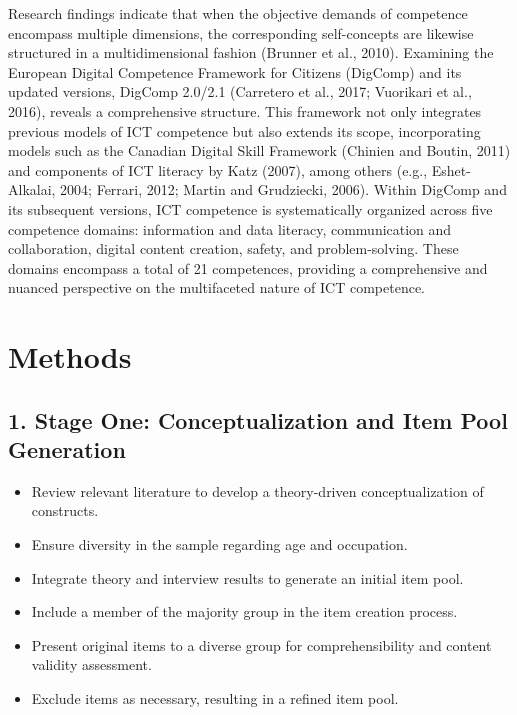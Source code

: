 \documentclass[
  12pt,
  a4paper,
  twoside]{article}
\providecommand{\tightlist}{%
  \setlength{\itemsep}{0pt}\setlength{\parskip}{0pt}}
\begin{document}
Research findings indicate that when the objective demands of competence encompass multiple dimensions, the corresponding self-concepts are likewise structured in a multidimensional fashion (Brunner et al., 2010). Examining the European Digital Competence Framework for Citizens (DigComp) and its updated versions, DigComp 2.0/2.1 (Carretero et al., 2017; Vuorikari et al., 2016), reveals a comprehensive structure. This framework not only integrates previous models of ICT competence but also extends its scope, incorporating models such as the Canadian Digital Skill Framework (Chinien and Boutin, 2011) and components of ICT literacy by Katz (2007), among others (e.g., Eshet-Alkalai, 2004; Ferrari, 2012; Martin and Grudziecki, 2006).
Within DigComp and its subsequent versions, ICT competence is systematically organized across five competence domains: information and data literacy, communication and collaboration, digital content creation, safety, and problem-solving. These domains encompass a total of 21 competences, providing a comprehensive and nuanced perspective on the multifaceted nature of ICT competence.

\hypertarget{methods}{%
\section{Methods}\label{methods}}

\hypertarget{stage-one-conceptualization-and-item-pool-generation}{%
\subsection{1. Stage One: Conceptualization and Item Pool Generation}\label{stage-one-conceptualization-and-item-pool-generation}}

\begin{itemize}
\tightlist
\item
  Review relevant literature to develop a theory-driven conceptualization of constructs.
\item
  Ensure diversity in the sample regarding age and occupation.
\item
  Integrate theory and interview results to generate an initial item pool.
\item
  Include a member of the majority group in the item creation process.
\item
  Present original items to a diverse group for comprehensibility and content validity assessment.
\item
  Exclude items as necessary, resulting in a refined item pool.
\end{itemize}
\end{document}

